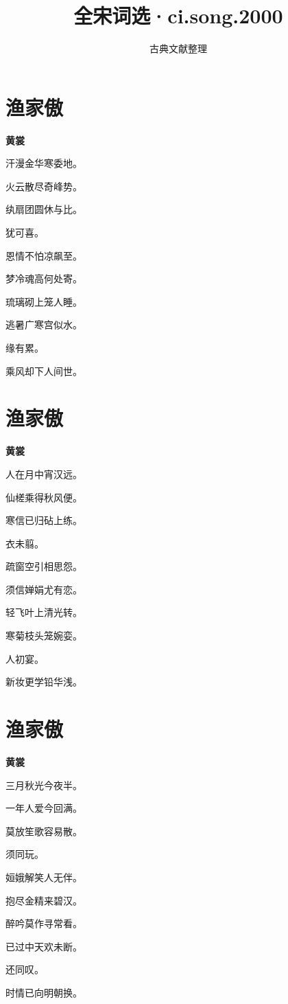 \documentclass[12pt,a4paper]{ctexbook}
\title{全宋词选·ci.song.2000}
\author{古典文献整理}
\date{}
\begin{document}
\maketitle
\tableofcontents
\newpage
\section{渔家傲}
\textbf{黄裳}\par\vspace{0.5em}
汗漫金华寒委地。\par
火云散尽奇峰势。\par
纨扇团圆休与比。\par
犹可喜。\par
恩情不怕凉飙至。\par
梦冷魂高何处寄。\par
琉璃砌上笼人睡。\par
逃暑广寒宫似水。\par
缘有累。\par
乘风却下人间世。\par

\section{渔家傲}
\textbf{黄裳}\par\vspace{0.5em}
人在月中宵汉远。\par
仙槎乘得秋风便。\par
寒信已归砧上练。\par
衣未翦。\par
疏窗空引相思怨。\par
须信婵娟尤有恋。\par
轻飞叶上清光转。\par
寒菊枝头笼婉娈。\par
人初宴。\par
新妆更学铅华浅。\par

\section{渔家傲}
\textbf{黄裳}\par\vspace{0.5em}
三月秋光今夜半。\par
一年人爱今回满。\par
莫放笙歌容易散。\par
须同玩。\par
姮娥解笑人无伴。\par
抱尽金精来碧汉。\par
醉吟莫作寻常看。\par
已过中天欢未断。\par
还同叹。\par
时情已向明朝换。\par
\end{document}
